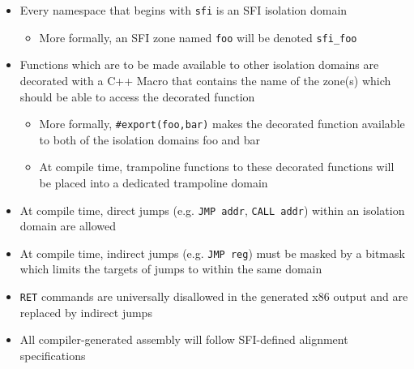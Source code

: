 \documentclass[12pt]{article}
\begin{document}
\begin{itemize}
	\item Every namespace that begins with \texttt{sfi} is an SFI isolation domain
	\begin{itemize}
		\item More formally, an SFI zone named \texttt{foo} will be denoted \texttt{sfi\_foo}
	\end{itemize}
	\item Functions which are to be made available to other isolation domains are decorated with a C++ Macro that contains the name of the zone(s) which should be able to access the decorated function
	\begin{itemize}
		\item More formally, \texttt{\#export(foo,bar)} makes the decorated function available to both of the isolation domains foo and bar
		\item At compile time, trampoline functions to these decorated functions will be placed into a dedicated trampoline domain
	\end{itemize}
	\item At compile time, direct jumps (e.g. \texttt{JMP addr}, \texttt{CALL addr}) within an isolation domain are allowed
	\item At compile time, indirect jumps (e.g. \texttt{JMP reg}) must be masked by a bitmask which limits the targets of jumps to within the same domain
	\item \texttt{RET} commands are universally disallowed in the generated x86 output and are replaced by indirect jumps
	\item All compiler-generated assembly will follow SFI-defined alignment specifications

\end{itemize}

\medskip
 
\printbibliography
 
\end{document}
